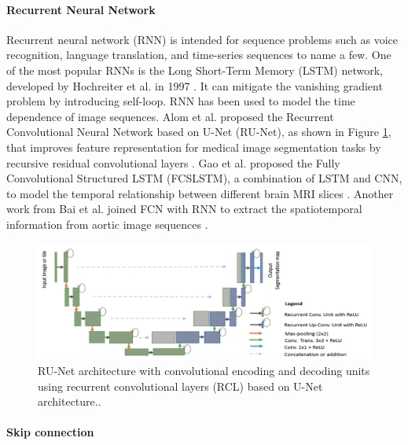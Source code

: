 \documentclass [11pt, proquest] {uwthesis}[2020/02/24]
\begin{document}
\paragraph{Recurrent Neural Network}

Recurrent neural network (RNN) is intended for sequence problems such as 
voice recognition, language translation, and time-series sequences to name 
a few. One of the most popular RNNs is the Long Short-Term Memory (LSTM) 
network, developed by Hochreiter et al. in 1997 \cite{ hochreiter_long_1997}. 
It can mitigate the vanishing gradient problem by introducing self-loop. RNN 
has been used to model the time dependence of image sequences. Alom et al. 
proposed the Recurrent Convolutional Neural Network based on U-Net (RU-Net), 
as shown in Figure \ref{rnnunet}, that improves feature representation for 
medical image segmentation tasks by recursive residual convolutional layers 
\cite{alom_recurrent_nodate}. Gao et al. proposed  the Fully Convolutional 
Structured LSTM (FCSLSTM), a combination of LSTM and CNN, to model the temporal 
relationship between different brain MRI slices \cite{gao_fully_2018}. Another 
work from Bai et al. joined FCN with RNN to extract the spatiotemporal information 
from aortic image sequences \cite{bai_recurrent_2018}.

\begin{figure}
  \centering
  \includegraphics[width=1\linewidth]{figures/rnnunet.png}
  \caption{RU-Net architecture with convolutional encoding and decoding units using 
  recurrent convolutional layers (RCL) based on U-Net architecture.\cite{alom_recurrent_nodate}.}
  \label{rnnunet}
\end{figure}


\paragraph{Skip connection}
\end{document}
